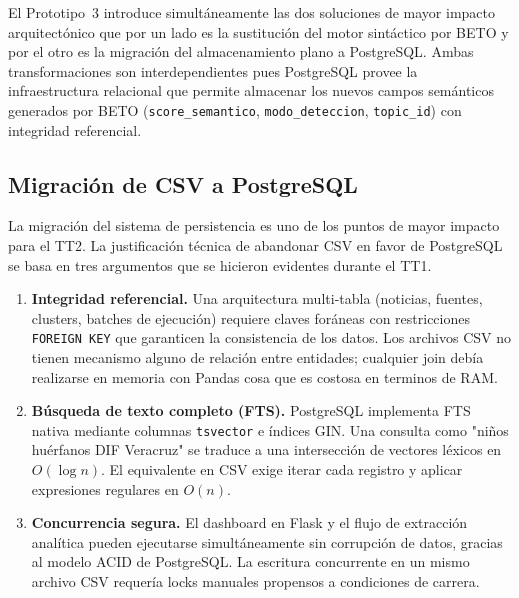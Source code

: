 El Prototipo~3 introduce simultáneamente las dos soluciones de mayor impacto
arquitectónico que por un lado es la sustitución del motor sintáctico por BETO y
por el otro es la migración del almacenamiento plano a PostgreSQL. Ambas
transformaciones son interdependientes pues PostgreSQL provee la infraestructura
relacional que permite almacenar los nuevos campos semánticos generados por
BETO (\texttt{score\_semantico}, \texttt{modo\_deteccion}, \texttt{topic\_id}) con
integridad referencial.

\subsection{Migración de CSV a PostgreSQL}
\label{subsec:tt2_postgres} 

La migración del sistema de persistencia es uno de los puntos de mayor impacto
para el TT2. La justificación técnica de abandonar CSV en favor de
PostgreSQL se basa en tres argumentos que se hicieron evidentes durante el TT1.

\begin{enumerate}
    \item \textbf{Integridad referencial.} Una arquitectura multi-tabla (noticias,
          fuentes, clusters, batches de ejecución) requiere claves foráneas con
          restricciones \texttt{FOREIGN KEY} que garanticen la consistencia de los
          datos. Los archivos CSV no tienen mecanismo alguno de relación entre
          entidades; cualquier join debía realizarse en memoria con Pandas cosa que
          es costosa en terminos de RAM.

    \item \textbf{Búsqueda de texto completo (FTS).} PostgreSQL implementa FTS
          nativa mediante columnas \texttt{tsvector} e índices GIN. Una consulta
          como "niños huérfanos DIF Veracruz" se traduce a una intersección de
          vectores léxicos en $O(\log n)$. El equivalente en CSV exige iterar cada
          registro y aplicar expresiones regulares en $O(n)$.

    \item \textbf{Concurrencia segura.} El dashboard en Flask y el flujo de
          extracción analítica pueden ejecutarse simultáneamente sin corrupción de
          datos, gracias al modelo ACID de PostgreSQL. La escritura concurrente
          en un mismo archivo CSV requería locks manuales propensos a condiciones
          de carrera.
\end{enumerate}

